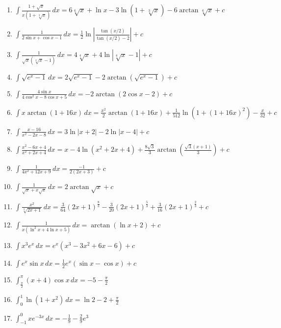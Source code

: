 \documentclass[11pt,a4paper]{article}
\begin{document}
\begin{enumerate}
\item $\displaystyle \int \frac{1 + \sqrt{x}}{x\left(1 + \sqrt[3]{x}\right)} \, dx = 6\sqrt[6]{x} + \ln x - 3\ln\left(1 + \sqrt[3]{x}\right) - 6\arctan\sqrt[6]{x} + c$
\item $\displaystyle \int \frac{1}{2\sin x + \cos x - 1} \, dx = \frac{1}{2}\ln\left|\frac{\tan(x/2)}{\tan(x/2) - 2}\right| + c$
\item $\displaystyle \int \frac{1}{\sqrt{x}\left(\sqrt[4]{x} - 1\right)} \, dx = 4\sqrt[4]{x} + 4\ln\left|\sqrt[4]{x} - 1\right| + c$
\item $\displaystyle \int \sqrt{e^{x} - 1} \, dx = 2\sqrt{e^{x} - 1} - 2\arctan\left(\sqrt{e^{x} - 1}\right) + c$
\item $\displaystyle \int \frac{4\sin x}{4\cos^{2} x - 8\cos x + 5} \, dx = -2\arctan\left(2\cos x - 2\right) + c$
\item $\displaystyle \int x\arctan\left(1 + 16x\right) \, dx = \frac{x^{2}}{2}\arctan\left(1 + 16x\right) + \frac{1}{512}\ln\left(1 + \left(1 + 16x\right)^{2}\right) - \frac{x}{32} + c$
\item $\displaystyle \int \frac{x - 16}{x^{2} - 2x - 8} \, dx = 3\ln|x + 2| - 2\ln|x - 4| + c$
\item $\displaystyle \int \frac{x^{2} - 6x + 4}{x^{2} + 2x + 4} \, dx = x - 4\ln\left(x^{2} + 2x + 4\right) + \frac{8\sqrt{3}}{3}\arctan\left(\frac{\sqrt{3}(x + 1)}{3}\right) + c$
\item $\displaystyle \int \frac{1}{4x^{2} + 12x + 9} \, dx = \frac{-1}{2(2x + 3)} + c$
\item $\displaystyle \int \frac{1}{\sqrt{x} + x\sqrt{x}} \, dx = 2\arctan\sqrt{x} + c$
\item $\displaystyle \int \frac{x^{2}}{\sqrt[3]{2x + 1}} \, dx = \frac{3}{64}(2x + 1)^{\frac{8}{3}} - \frac{3}{20}(2x + 1)^{\frac{5}{3}} + \frac{3}{16}(2x + 1)^{\frac{2}{3}} + c$
\item $\displaystyle \int \frac{1}{x\left(\ln^{2} x + 4\ln x + 5\right)} \, dx = \arctan(\ln x + 2) + c$
\item $\displaystyle \int x^{3} e^{x} \, dx = e^{x}\left(x^{3} - 3x^{2} + 6x - 6\right) + c$
\item $\displaystyle \int e^{x}\sin x \, dx = \frac{1}{2}e^{x}(\sin x - \cos x) + c$
\item $\displaystyle \int_{\frac{\pi}{2}}^{\pi} (x + 4)\cos x \, dx = -5 - \frac{\pi}{2}$
\item $\displaystyle \int_{0}^{1} \ln\left(1 + x^{2}\right) \, dx = \ln 2 - 2 + \frac{\pi}{2}$
\item $\displaystyle \int_{-1}^{0} x e^{-3x} \, dx = -\frac{1}{9} - \frac{2}{9}e^{3}$

\end{enumerate}
\end{document}
